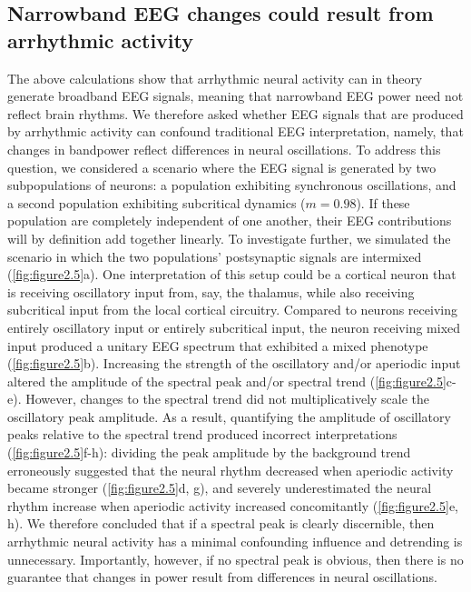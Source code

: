 \subsection{Narrowband EEG changes could result from arrhythmic activity}
The above calculations show that arrhythmic neural activity can in theory generate broadband EEG signals, meaning that narrowband EEG power need not reflect brain rhythms. We therefore asked whether EEG signals that are produced by arrhythmic activity can confound traditional EEG interpretation, namely, that changes in bandpower reflect differences in neural oscillations. To address this question, we considered a scenario where the EEG signal is generated by two subpopulations of neurons: a population exhibiting synchronous oscillations, and a second population exhibiting subcritical dynamics ($m=0.98$). If these population are completely independent of one another, their EEG contributions will by definition add together linearly. To investigate further, we simulated the scenario in which the two populations’ postsynaptic signals are intermixed (\autoref{fig:figure2.5}a). One interpretation of this setup could be a cortical neuron that is receiving oscillatory input from, say, the thalamus, while also receiving subcritical input from the local cortical circuitry. Compared to neurons receiving entirely oscillatory input or entirely subcritical input, the neuron receiving mixed input produced a unitary EEG spectrum that exhibited a mixed phenotype (\autoref{fig:figure2.5}b). Increasing the strength of the oscillatory and/or aperiodic input altered the amplitude of the spectral peak and/or spectral trend (\autoref{fig:figure2.5}c-e). However, changes to the spectral trend did not multiplicatively scale the oscillatory peak amplitude. As a result, quantifying the amplitude of oscillatory peaks relative to the spectral trend produced incorrect interpretations (\autoref{fig:figure2.5}f-h): dividing the peak amplitude by the background trend erroneously suggested that the neural rhythm decreased when aperiodic activity became stronger (\autoref{fig:figure2.5}d, g), and severely underestimated the neural rhythm increase when aperiodic activity increased concomitantly (\autoref{fig:figure2.5}e, h). We therefore concluded that if a spectral peak is clearly discernible, then arrhythmic neural activity has a minimal confounding influence and detrending is unnecessary. Importantly, however, if no spectral peak is obvious, then there is no guarantee that changes in power result from differences in neural oscillations.

